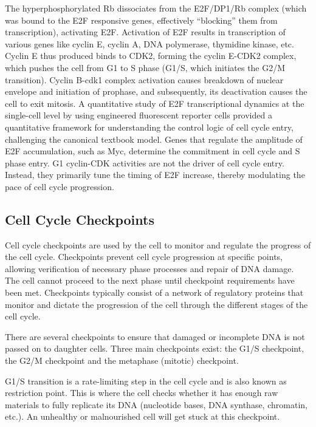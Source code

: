 The hyperphosphorylated Rb dissociates from the E2F/DP1/Rb complex (which was bound to the E2F responsive genes, effectively ``blocking'' them from transcription), activating E2F. Activation of E2F results in transcription of various genes like cyclin E, cyclin A, DNA polymerase, thymidine kinase, etc. Cyclin E thus produced binds to CDK2, forming the cyclin E-CDK2 complex, which pushes the cell from G1 to S phase (G1/S, which initiates the G2/M transition). Cyclin B-cdk1 complex activation causes breakdown of nuclear envelope and initiation of prophase, and subsequently, its deactivation causes the cell to exit mitosis. A quantitative study of E2F transcriptional dynamics at the single-cell level by using engineered fluorescent reporter cells provided a quantitative framework for understanding the control logic of cell cycle entry, challenging the canonical textbook model. Genes that regulate the amplitude of E2F accumulation, such as Myc, determine the commitment in cell cycle and S phase entry. G1 cyclin-CDK activities are not the driver of cell cycle entry. Instead, they primarily tune the timing of E2F increase, thereby modulating the pace of cell cycle progression.

\hypertarget{cell-cycle-checkpoints}{%
\subsection{Cell Cycle Checkpoints}\label{cell-cycle-checkpoints}}

Cell cycle checkpoints are used by the cell to monitor and regulate the progress of the cell cycle. Checkpoints prevent cell cycle progression at specific points, allowing verification of necessary phase processes and repair of DNA damage. The cell cannot proceed to the next phase until checkpoint requirements have been met. Checkpoints typically consist of a network of regulatory proteins that monitor and dictate the progression of the cell through the different stages of the cell cycle.

There are several checkpoints to ensure that damaged or incomplete DNA is not passed on to daughter cells. Three main checkpoints exist: the G1/S checkpoint, the G2/M checkpoint and the metaphase (mitotic) checkpoint.

G1/S transition is a rate-limiting step in the cell cycle and is also known as restriction point. This is where the cell checks whether it has enough raw materials to fully replicate its DNA (nucleotide bases, DNA synthase, chromatin, etc.). An unhealthy or malnourished cell will get stuck at this checkpoint.

